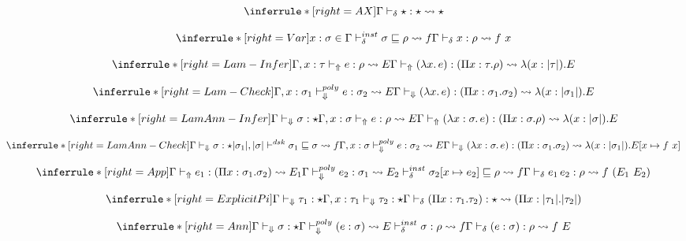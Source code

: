 \[
\inferrule*[right=AX]
{} {\infercheck \star : \star \transto{\star}}
\]

\[
\inferrule*[right=Var]
{x:\sigma \in \Gamma \\ \instinfercheck \sigma \sqsubseteq \rho \transto{f} } {\infercheck x : \rho \transto{f\ x}}
\]

\[
\inferrule*[right=Lam-Infer]
{\Gamma,x: \tau \infertypeno e : \rho \transto{E} }
{\infertype (\lambda x.\, e) : (\Pi x: \tau. \rho) \transto {\lambda(x:\translated{\tau}). E}}
\]

\[
\inferrule*[right=Lam-Check]
{\Gamma,x: \sigma_1 \polycheckno e : \sigma_2 \transto{E}
} {\checktype (\lambda x.\, e) : (\Pi x: \sigma_1. \sigma_2) \transto{\lambda(x:\translated{\sigma_1}).E}}
\]

\[
\inferrule*[right=LamAnn-Infer]
{
\checktype \sigma:\star \\
\Gamma,x: \sigma \infertypeno e : \rho \transto{E}
} {\infertype (\lambda x:\sigma.\, e) : (\Pi x: \sigma. \rho) \transto{\lambda(x:\translated{\sigma}). E}}
\]

\[
\inferrule*[right=LamAnn-Check]
{
\checktype \sigma:\star \\
\translated{\sigma_1}, \translated{\sigma} \dsk \sigma_1 \sqsubseteq \sigma \transto{f} \\
\Gamma,x: \sigma \polycheckno e : \sigma_2 \transto{E} \\
}
{\checktype (\lambda x:\sigma.\, e) : (\Pi x: \sigma_1. \sigma_2) \transto{ \lambda(x:\translated{\sigma_1}). E[\tpmapsto \sigma x {f\ x}] }}
\]

\[
\inferrule*[right=App]
{\infertype e_1 : (\Pi x:\sigma_1. \sigma_2) \transto {E_1} \\
\polycheck e_2 : \sigma_1 \transto{E_2}\\
\instinfercheck \sigma_2 [\tpmapsto {\sigma_1} x e_2] \sqsubseteq \rho \transto{f}}
{\infercheck e_1\,e_2 : \rho \transto{f\ (E_1\ E_2)}}
\]

\[
\inferrule*[right=ExplicitPi]
{\checktype \tau_1 : \star \\ \Gamma, x:\tau_1 \checktypeno \tau_2 : \star }
{\infercheck (\Pi x:\tau_1. \tau_2) : \star \transto{(\Pi x:\translated{\tau_1}. \translated{\tau_2})}}
\]

\[
\inferrule*[right=Ann]
{
\checktype \sigma : \star \\
\polycheck (e:\sigma) \transto{E}\\
\instinfercheck \sigma : \rho \transto{f}}
{\infercheck (e : \sigma) : \rho \transto{f\ E}}
\]

